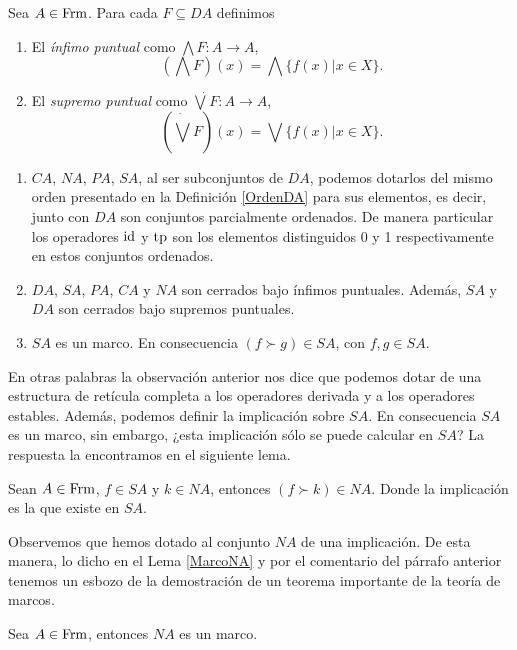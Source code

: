 \begin{dfn}\label{InfSupPuntual}
Sea $A\in \mathrm{Frm}$. Para cada $F\subseteq DA$ definimos
\begin{enumerate}
\item El \emph{ínfimo puntual} como $\bigwedge F:A\to A$,
$$(\bigwedge F)(x)=\bigwedge\{f(x)|x\in X\}.$$
\item El \emph{supremo puntual} como $\dot{\bigvee} F:A\to A$,
$$(\dot{\bigvee} F)(x)=\bigvee\{f(x)|x\in X\}.$$
\end{enumerate}
\end{dfn}

\begin{obs}
\noindent
\begin{enumerate}
\item $CA$, $NA$, $PA$, $SA$, al ser subconjuntos de $DA$, podemos dotarlos del mismo orden presentado en la Definición \ref{OrdenDA} para sus elementos, es decir, junto con $DA$ son conjuntos parcialmente ordenados. De manera particular los operadores $\mathrm{id}$ y $\mathrm{tp}$ son los elementos distinguidos 0 y 1 respectivamente en estos conjuntos ordenados.
\item $DA$, $SA$, $PA$, $CA$ y $NA$ son cerrados bajo ínfimos puntuales. Además, $SA$ y $DA$ son cerrados bajo supremos puntuales.
\item $SA$ es un marco. En consecuencia $(f\succ g)\in SA$, con $f,g\in SA$.  
\end{enumerate}
\end{obs}

En otras palabras la observación anterior nos dice que podemos dotar de una estructura de retícula completa a los operadores derivada y a los operadores estables. Además, podemos definir la implicación sobre $SA$. En consecuencia $SA$ es un marco, sin embargo, ¿esta implicación sólo se puede calcular en $SA$? La respuesta la encontramos en el siguiente lema.

\begin{lem}\label{MarcoNA}
Sean $A\in \mathrm{Frm}$, $f\in SA$ y $k\in NA$, entonces $(f\succ k)\in NA$. Donde la implicación es la que existe en $SA$.
\end{lem}

Observemos que hemos dotado al conjunto $NA$ de una implicación. De esta manera, lo dicho en el Lema \ref{MarcoNA} y por el comentario del párrafo anterior tenemos un esbozo de la demostración de un teorema importante de la teoría de marcos.

\begin{thm}\label{TeoEnsamble}
Sea $A\in \mathrm{Frm}$, entonces $NA$ es un marco.
\end{thm}


